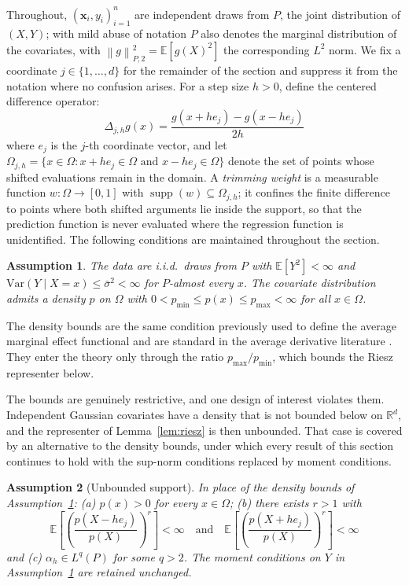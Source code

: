 \documentclass[12pt]{article}
\newtheorem{assumption}{Assumption}
\newcommand{\norm}[1]{\left\| #1 \right\|}
\newcommand{\R}{\mathbb{R}}
\newcommand{\E}{\mathbb{E}}
\newcommand{\Dh}{\Delta_{j,h}}
\begin{document}
	Throughout, $(\mathbf{x}_i, y_i)_{i=1}^n$ are independent draws from $P$, the joint
	distribution of $(X, Y)$; with mild abuse of notation $P$ also denotes the marginal
	distribution of the covariates, with $\norm{g}_{P,2}^2 = \E[g(X)^2]$ the
	corresponding $L^2$ norm. We fix a coordinate $j \in \{1, \dots, d\}$ for the
	remainder of the section and suppress it from the notation where no confusion
	arises. For a step size $h > 0$, define the centered difference operator:
	\begin{equation}
		\Dh g(x) = \frac{g(x + h e_j) - g(x - h e_j)}{2h}
	\end{equation}
	where $e_j$ is the $j$-th coordinate vector, and let
	$\Omega_{j,h} = \{x \in \Omega : x + h e_j \in \Omega \text{ and }
	x - h e_j \in \Omega\}$ denote the set of points whose shifted evaluations remain in
	the domain. A \emph{trimming weight} is a measurable function
	$w : \Omega \to [0,1]$ with $\operatorname{supp}(w) \subseteq \Omega_{j,h}$; it
	confines the finite difference to points where both shifted arguments lie inside the
	support, so that the prediction function is never evaluated where the regression
	function is unidentified. The following conditions are maintained throughout the
	section.
	
	\begin{assumption}
		\label{ass:sampling}
		The data are i.i.d.\ draws from $P$ with $\E[Y^2] < \infty$ and
		$\mathrm{Var}(Y \mid X = x) \leq \bar{\sigma}^2 < \infty$ for $P$-almost every
		$x$. The covariate distribution admits a density $p$ on $\Omega$ with
		$0 < p_{\min} \leq p(x) \leq p_{\max} < \infty$ for all $x \in \Omega$.
	\end{assumption}
	
	The density bounds are the same condition previously used to define the average
	marginal effect functional and are standard in the average derivative literature
	\citep{powell1989, newey1993}. They enter the theory only through the ratio
	$p_{\max}/p_{\min}$, which bounds the Riesz representer below.

	The bounds are genuinely restrictive, and one design of interest violates them.
	Independent Gaussian covariates have a density that is not bounded below on
	$\R^d$, and the representer of Lemma~\ref{lem:riesz} is then unbounded. That case
	is covered by an alternative to the density bounds, under which every result of
	this section continues to hold with the sup-norm conditions replaced by moment
	conditions.

	\begin{assumption}[Unbounded support]
		\label{ass:unbounded}
		In place of the density bounds of Assumption~\ref{ass:sampling}: (a)
		$p(x) > 0$ for every $x \in \Omega$; (b) there exists $r > 1$ with
		\begin{equation}
			\E\left[\left(\frac{p(X - h e_j)}{p(X)}\right)^{r}\right] < \infty
			\quad\text{and}\quad
			\E\left[\left(\frac{p(X + h e_j)}{p(X)}\right)^{r}\right] < \infty
			\label{eq:shiftmoment}
		\end{equation}
		and (c) $\alpha_h \in L^{q}(P)$ for some $q > 2$. The moment conditions on
		$Y$ in Assumption~\ref{ass:sampling} are retained unchanged.
	\end{assumption}
\end{document}
